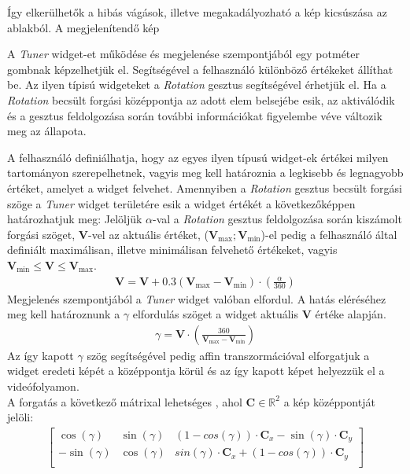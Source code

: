 Így elkerülhetők a hibás vágások, illetve megakadályozható a kép kicsúszása az ablakból.
A megjelenítendő kép


A \textit{Tuner} widget-et működése és megjelenése szempontjából egy potméter gombnak képzelhetjük el. Segítségével a felhasználó különböző értékeket állíthat be.
Az ilyen típisú widgeteket a \textit{Rotation} gesztus segítségével érhetjük el. Ha a \textit{Rotation} becsült forgási középpontja az adott elem belsejébe esik, az aktiválódik és a gesztus feldolgozása során további információkat figyelembe véve változik meg az állapota.

A felhasználó definiálhatja, hogy az egyes ilyen típusú widget-ek értékei milyen tartományon szerepelhetnek, vagyis meg kell határoznia a legkisebb és legnagyobb értéket, amelyet a widget felvehet. Amennyiben a \textit{Rotation} gesztus becsült forgási szöge a \textit{Tuner} widget területére esik a widget értékét a következőképpen határozhatjuk meg:
Jelöljük $\alpha$-val a \textit{Rotation} gesztus feldolgozása során kiszámolt forgási szöget, $\boldsymbol V$-vel az aktuális értéket, ($\boldsymbol V_{\max}; \boldsymbol V_{\min}$)-el pedig a felhasználó által definiált maximálisan, illetve minimálisan felvehető értékeket, vagyis $\boldsymbol V_{\min} \leq \boldsymbol V \leq \boldsymbol V_{\max}$.
\begin{align*}
	\boldsymbol V = \boldsymbol V + 0.3\left(\boldsymbol V_{\max} - \boldsymbol V_{\min}\right) \cdot \left( \frac{\alpha}{360}\right)
\end{align*}
Megjelenés szempontjából a \textit{Tuner} widget valóban elfordul. A hatás eléréséhez meg kell határoznunk a $\gamma$ elfordulás szöget a widget aktuális $\boldsymbol V$ értéke alapján.
\begin{align*}
	\gamma = \boldsymbol V \cdot \left(\frac{360}{\boldsymbol V_{\max} - \boldsymbol V_{\min}}\right)
\end{align*}
Az így kapott $\gamma$ szög segítségével pedig affin transzormációval elforgatjuk a widget eredeti képét a középpontja körül és az így kapott képet helyezzük el a videófolyamon.\\
A forgatás a következő mátrixal lehetséges \cite{bradski2008learning}, ahol $\boldsymbol C \in \mathbb{R}^2$ a kép középpontját jelöli:
\begin{align*}
	\begin{bmatrix}
		\cos(\gamma) & \sin(\gamma) & (1-cos(\gamma))\cdot \boldsymbol C_x-\sin(\gamma)\cdot \boldsymbol C_y\\
		-\sin(\gamma) & \cos(\gamma) & sin(\gamma)\cdot \boldsymbol C_x+(1-cos(\gamma))\cdot \boldsymbol C_y\\
	\end{bmatrix}
\end{align*}
